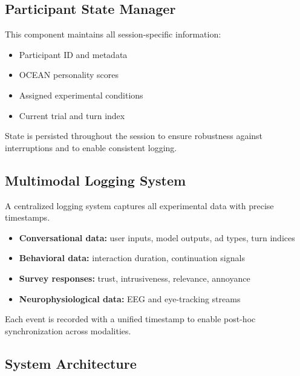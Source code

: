 \documentclass{article}
\begin{document}
\vspace{0.3cm}

\subsection{Participant State Manager}

This component maintains all session-specific information:

\begin{itemize}
    \item Participant ID and metadata
    \item OCEAN personality scores
    \item Assigned experimental conditions
    \item Current trial and turn index
\end{itemize}

State is persisted throughout the session to ensure robustness against interruptions and to enable consistent logging.

\vspace{0.3cm}

\subsection{Multimodal Logging System}

A centralized logging system captures all experimental data with precise timestamps.

\begin{itemize}
    \item \textbf{Conversational data:} user inputs, model outputs, ad types, turn indices
    \item \textbf{Behavioral data:} interaction duration, continuation signals
    \item \textbf{Survey responses:} trust, intrusiveness, relevance, annoyance
    \item \textbf{Neurophysiological data:} EEG and eye-tracking streams
\end{itemize}

Each event is recorded with a unified timestamp to enable post-hoc synchronization across modalities.

\vspace{0.3cm}

\subsection{System Architecture}
\end{document}
